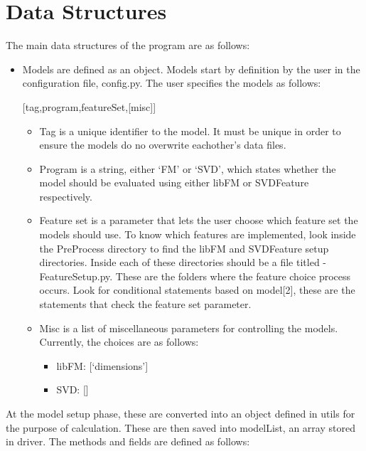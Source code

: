 \documentclass{article}
\begin{document}
\section{Data Structures}

The main data structures of the program are as follows:

\begin{itemize}
\item
  Models are defined as an object. Models start by definition by the
  user in the configuration file, config.py. The user specifies the
  models as follows:

  {[}tag,program,featureSet,{[}misc{]}{]}
\begin{itemize}
\item
  Tag is a unique identifier to the model. It must be unique in order to
  ensure the models do no overwrite eachother's data files.
\item
  Program is a string, either `FM' or `SVD', which states whether the
  model should be evaluated using either libFM or SVDFeature
  respectively.
\item
  Feature set is a parameter that lets the user choose which feature set
  the models should use. To know which features are implemented, look
  inside the PreProcess directory to find the libFM and SVDFeature setup
  directories. Inside each of these directories should be a file titled
  -FeatureSetup.py. These are the folders where the feature choice
  process occurs. Look for conditional statements based on model{[}2{]},
  these are the statements that check the feature set parameter.
\item
  Misc is a list of miscellaneous parameters for controlling the models.
  Currently, the choices are as follows:

	\begin{itemize}
	\item libFM: {[}`dimensions'{]} 
	\item SVD: {[}{]}
	\end{itemize}
\end{itemize}
\end{itemize}

At the model setup phase, these are converted into an object defined in
utils for the purpose of calculation. These are then saved into
modelList, an array stored in driver. The methods and fields are defined
as follows:
\end{document}
